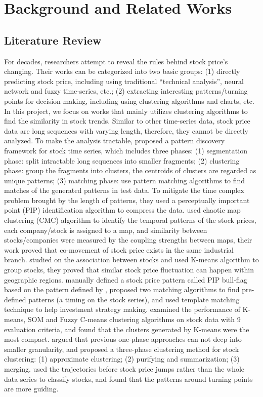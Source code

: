 \chapter{Background and Related Works}
\label{ch:background}
\section{Literature Review}
For decades, researchers attempt to reveal the rules behind stock price's changing. Their works can be categorized into two basic groups: (1) directly predicting stock price, including using traditional ``technical analysis'', neural network and fuzzy time-series, etc.; (2) extracting interesting patterns/turning points for decision making, including using clustering algorithms and charts, etc. In this project, we focus on works that mainly utilizes clustering algorithms to find the similarity in stock trends. Similar to other time-series data, stock price data are long sequences with varying length, therefore, they cannot be directly analyzed.
To make the analysis tractable, \cite{fu2001pattern} proposed a pattern discovery framework for stock time series, which includes three phases: (1) segmentation phase: split intractable long sequences into smaller fragments; (2) clustering phase: group the fragments into clusters, the centroids of clusters are regarded as unique patterns; (3) matching phase: use pattern matching algorithms to find matches of the generated patterns in test data. To mitigate the time complex problem brought by the length of patterns, they used a perceptually important point (PIP) identification algorithm to compress the data. 
\cite{basalto2005clustering} used chaotic map clustering (CMC) algorithm to identify the temporal patterns of the stock prices, each company/stock is assigned to a map, and similarity between stocks/companies were measured by the coupling strengths between maps, their work proved that co-movement of stock price exists in the same industrial branch. \cite{liao2008mining} studied on the association between stocks and used K-means algorithm to group stocks, they proved that similar stock price fluctuation can happen within geographic regions. \cite{chen2016intelligent} manually defined a stock price pattern called PIP bull-flag based on the pattern defined by \cite{leigh2002stock,leigh2002forecasting}, proposed two matching algorithms to find pre-defined patterns (a timing on the stock series), and used template matching technique to help investment strategy making. \cite{nanda2010clustering} examined the performance of K-means, SOM and Fuzzy C-means clustering algorithms on stock data with 9 evaluation criteria, and found that the clusters generated by K-means were the most compact. \cite{aghabozorgi2014stock} argued that previous one-phase approaches can not deep into smaller granularity, and proposed a three-phase clustering method for stock clustering: (1) approximate clustering; (2) purifying and summarization; (3) merging. \cite{kong2020pattern} used the trajectories before stock price jumps rather than the whole data series to classify stocks, and found that the patterns around turning points are more guiding.

